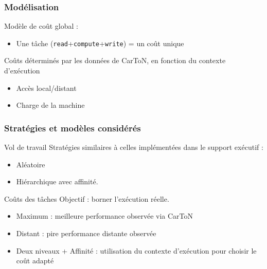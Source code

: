\documentclass[xcolor={usenames,dvipsnames,svgnames,table}, aspectratio=43]{beamer}
\begin{document}
\begin{frame}[fragile]
  \frametitle{Modélisation}

  Modèle de coût global :

  \begin{itemize}
    \item Une tâche (\verb/read/+\verb/compute/+\verb/write/) = un coût unique
  \end{itemize}

  Coûts déterminés par les données de CarToN, en fonction du contexte d'exécution
  \begin{itemize}
    \item Accès local/distant
    \item Charge de la machine
  \end{itemize}

\end{frame}

\begin{frame}
  \frametitle{Stratégies et modèles considérés}

  \begin{block}{Vol de travail}
    Stratégies similaires à celles implémentées dans le support exécutif :
    \begin{itemize}
      \item Aléatoire
      \item Hiérarchique avec affinité.
    \end{itemize}
  \end{block}

  \begin{block}{Coûts des tâches}
    Objectif : borner l'exécution réelle.
    \begin{itemize}
      \item Maximum : meilleure performance observée via CarToN
      \item Distant : pire performance distante observée
      \item Deux niveaux + Affinité : utilisation du contexte d'exécution pour choisir le coût adapté
    \end{itemize}
  \end{block}

\end{frame}
\end{document}
